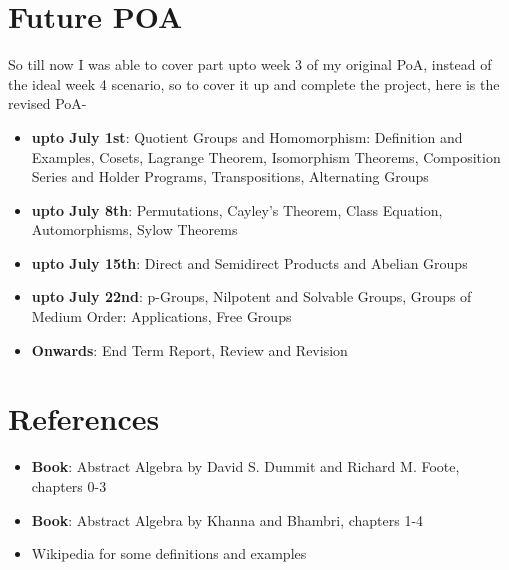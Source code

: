 \documentclass[12pt,a4paper,oneside]{report}
\theoremstyle{definition}
\begin{document}
\chapter{Future POA}
So till now I was able to cover part upto week 3 of my original PoA, instead of the ideal week 4 scenario, so to cover it up and complete the project, here is the revised PoA-
\begin{itemize}
  \item \textbf{upto July 1st}: Quotient Groups and Homomorphism: Definition and
  Examples, Cosets, Lagrange Theorem, Isomorphism Theorems,
  Composition Series and Holder Programs, Transpositions,
  Alternating Groups
  \item \textbf{upto July 8th}:  Permutations, Cayley’s Theorem, Class Equation,
  Automorphisms, Sylow Theorems
  \item \textbf{upto July 15th}:  Direct and Semidirect Products and Abelian Groups
  \item \textbf{upto July 22nd}:  p-Groups, Nilpotent and Solvable Groups, Groups of
  Medium Order: Applications, Free Groups
  \item \textbf{Onwards}: End Term Report, Review and Revision
\end{itemize}
\chapter{References}
\begin{itemize}
  \item \textbf{Book}: Abstract Algebra by David S. Dummit and Richard M. Foote, chapters 0-3
  \item \textbf{Book}: Abstract Algebra by Khanna and Bhambri, chapters 1-4
  \item Wikipedia for some definitions and examples
\end{itemize}
\end{document}
